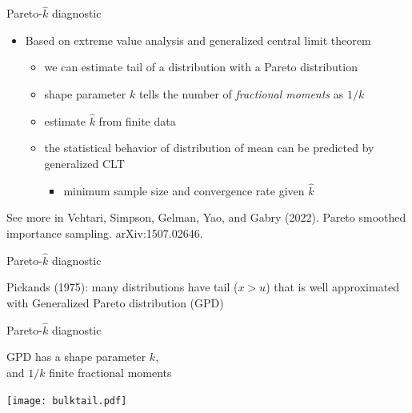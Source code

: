 \documentclass[english,t]{beamer}
\begin{document}
\begin{frame}{Pareto-$\hat{k}$ diagnostic}

  \begin{itemize}
  \item Based on extreme value analysis and generalized central limit theorem
    \begin{itemize}
    \item<2-> we can estimate tail of a distribution with a Pareto distribution
    \item<3-> shape parameter $k$ tells the number of \textit{fractional moments} as $1/k$
    \item<3-> estimate $\hat{k}$ from finite data
    \item<4-> the statistical behavior of distribution of mean can be
      predicted by generalized CLT
      \begin{itemize}
      \item minimum sample size and convergence rate given $\hat{k}$
      \end{itemize}
    \end{itemize}
  \end{itemize}

  \vspace{5\baselineskip}
  {\small
  See more in Vehtari, Simpson, Gelman, Yao, and Gabry (2022). Pareto
  smoothed importance sampling. arXiv:1507.02646.}
  
\end{frame}

\begin{frame}{Pareto-$\hat{k}$ diagnostic}

   Pickands (1975): many distributions have tail ($x > u$) that
    is well approximated with Generalized Pareto distribution (GPD)

    {
      \vspace{-0.5\baselineskip}
}

\end{frame}

\begin{frame}{Pareto-$\hat{k}$ diagnostic}

 GPD has a shape parameter $k$,\\and $1/k$ finite fractional
    moments

    {
      \vspace{-0.5\baselineskip}
  \texttt{[image: bulktail.pdf]}
}

\end{frame}
\end{document}
